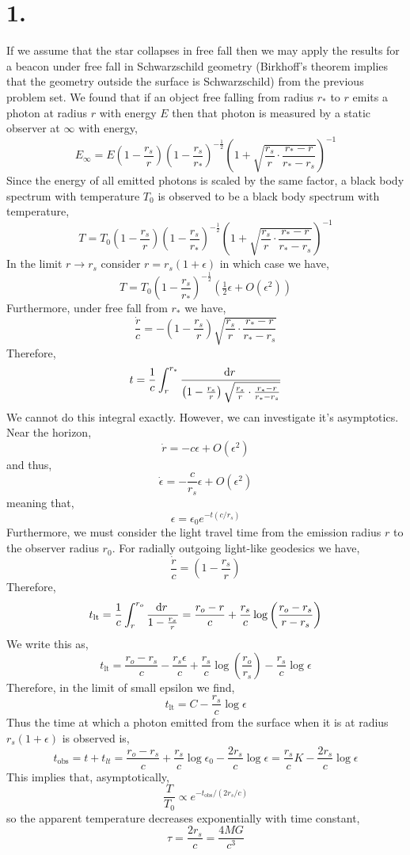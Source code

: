 \documentclass[12pt]{article}
\begin{document}

\section*{1.}

If we assume that the star collapses in free fall then we may apply the results for a beacon under free fall in Schwarzschild geometry (Birkhoff's theorem implies that the geometry outside the surface is Schwarzschild) from the previous problem set. We found that if an object free falling from radius $r_*$ to $r$ emits a photon at radius $r$ with energy $E$ then that photon is measured by a static observer at $\infty$ with energy,
\[  E_{\infty} = E \left(1 - \frac{r_s}{r} \right) \left(1 - \frac{r_s}{r_*} \right)^{-\frac{1}{2}} \left( 1  + \sqrt{\frac{r_s}{r} \cdot \frac{r_* - r}{r_* - r_s}} \right)^{-1} \]
Since the energy of all emitted photons is scaled by the same factor, a black body spectrum with temperature $T_0$ is observed to be a black body spectrum with temperature,
\[ T = T_0 \left(1 - \frac{r_s}{r} \right) \left(1 - \frac{r_s}{r_*} \right)^{-\frac{1}{2}} \left( 1  + \sqrt{\frac{r_s}{r} \cdot \frac{r_* - r}{r_* - r_s}} \right)^{-1} \]
In the limit $r \to r_s$ consider $r = r_s (1 + \epsilon)$ in which case we have,
\[ T = T_0 \left( 1 - \frac{r_s}{r_*} \right)^{-\frac{1}{2}} \left(  \tfrac{1}{2} \epsilon  + O(\epsilon^2) \right) \]
Furthermore, under free fall from $r_*$ we have,
\[ \frac{\dot{r}}{c} = -\left(1 - \frac{r_s}{r} \right) \sqrt{\frac{r_s}{r}\cdot \frac{r_* - r}{r_* - r_s}} \]
Therefore,
\[ t = \frac{1}{c} \int_{r}^{r_*} \frac{\mathrm{d}r \:}{\left(1 - \frac{r_s}{r} \right) \sqrt{\frac{r_s}{r}\cdot \frac{r_* - r}{r_* - r_s}} } \]
We cannot do this integral exactly. However, we can investigate it's asymptotics. Near the horizon,
\[ \dot{r} = - c \epsilon + O(\epsilon^2) \] 
and thus,
\[ \dot{\epsilon} = - \frac{c}{r_s} \epsilon + O(\epsilon^2) \]
meaning that,
\[ \epsilon = \epsilon_0 e^{-t (c/r_s)} \]
Furthermore, we must consider the light travel time from the emission radius $r$ to the observer radius $r_0$. For radially outgoing light-like geodesics we have,
\[ \frac{\dot{r}}{c} = \left( 1 - \frac{r_s}{r} \right) \]
Therefore,
\[ t_{\text{lt}} = \frac{1}{c} \int_{r}^{r_o} \frac{\mathrm{d}r \:}{1 - \frac{r_s}{r}} = \frac{r_o - r}{c} + \frac{r_s}{c} \log{\left( \frac{r_o - r_s}{r - r_s} \right)} \]
We write this as,
\[ t_{\text{lt}} = \frac{r_o - r_s}{c} - \frac{r_s \epsilon}{c} + \frac{r_s}{c} \log{\left( \frac{r_o}{r_s} \right)} - \frac{r_s}{c} \log{\epsilon} \]
Therefore, in the limit of small epsilon we find,
\[  t_{\text{lt}} = C - \frac{r_s}{c} \log{\epsilon} \]
Thus the time at which a photon emitted from the surface when it is at radius $r_s(1 + \epsilon)$ is observed is,
\[ t_{\text{obs}} = t + t_{lt} = \frac{r_o - r_s}{c} + \frac{r_s}{c} \log{\epsilon_0} - \frac{2 r_s}{c} \log{\epsilon} = \frac{r_s}{c} K - \frac{2 r_s}{c} \log{\epsilon} \]
This implies that, asymptotically, 
\[ \frac{T}{T_0} \propto e^{- t_{\text{obs}} / (2 r_s / c)} \]
so the apparent temperature decreases exponentially with time constant,
\[ \tau = \frac{2 r_s}{c} = \frac{4 M G}{c^3} \]
\end{document}
